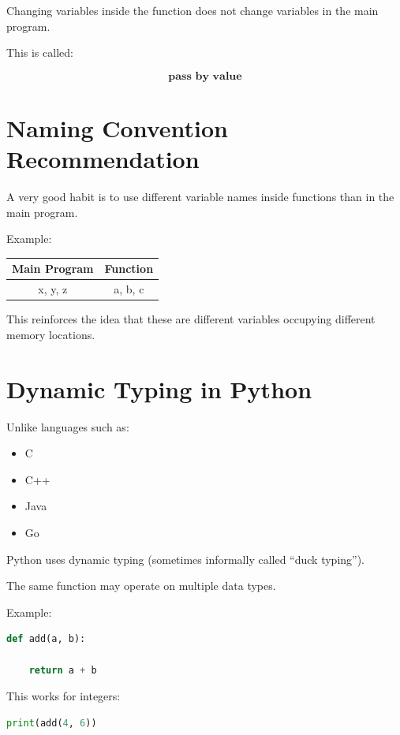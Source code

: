 \documentclass[11pt]{article}
\begin{document}
Changing variables inside the function does not change variables in the main program.

This is called:

\[
\textbf{pass by value}
\]

\section{Naming Convention Recommendation}

A very good habit is to use different variable names inside functions than in the main program.

Example:

\begin{center}
\begin{tabular}{|c|c|}
\hline
Main Program & Function \\
\hline
x, y, z & a, b, c \\
\hline
\end{tabular}
\end{center}

This reinforces the idea that these are different variables occupying different memory locations.

\section{Dynamic Typing in Python}

Unlike languages such as:

\begin{itemize}
    \item C
    \item C++
    \item Java
    \item Go
\end{itemize}

Python uses dynamic typing (sometimes informally called ``duck typing'').

The same function may operate on multiple data types.

Example:

\begin{lstlisting}[language=Python]
def add(a, b):

    return a + b
\end{lstlisting}

This works for integers:

\begin{lstlisting}[language=Python]
print(add(4, 6))
\end{lstlisting}
\end{document}
